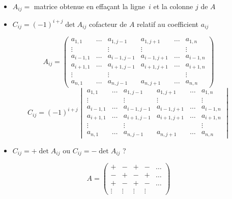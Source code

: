 \begin{frame}
\begin{itemize}
  \item $A_{ij} =$ matrice obtenue en effaçant la ligne~$i$ et la colonne $j$ de $A$
  \item<4-> $C_{ij} = (-1)^{i+j}\det A_{ij} $ cofacteur de $A$ relatif au coefficient $a_{ij}$
\end{itemize}

 \begin{overprint}
  
\vspace{.2cm}
\[
A_{ij} = \begin{pmatrix}
a_{1,1} & \dots & a_{1,j-1} & a_{1,j+1} &\dots & a_{1,n}\\
\vdots &&\vdots &\vdots &&\vdots \\
a_{i-1,1} & \dots & a_{i-1,j-1} & a_{i-1,j+1} &\dots & a_{i-1,n}\\
a_{i+1,1} & \dots & a_{i+1,j-1} & a_{i+1,j+1} &\dots & a_{i+1,n}\\
\vdots &&\vdots &&&\vdots \\
a_{n,1} & \dots & a_{n,j-1} & a_{n,j+1}& \dots & a_{n,n}  
\end{pmatrix}
\]
\vspace{.2cm}
\[
C_{ij} = (-1)^{i+j}\begin{vmatrix}
a_{1,1} & \dots & a_{1,j-1} & a_{1,j+1} &\dots & a_{1,n}\\
\vdots &&\vdots &\vdots &&\vdots \\
a_{i-1,1} & \dots & a_{i-1,j-1} & a_{i-1,j+1} &\dots & a_{i-1,n}\\
a_{i+1,1} & \dots & a_{i+1,j-1} & a_{i+1,j+1} &\dots & a_{i+1,n}\\
\vdots &&\vdots &&&\vdots \\
a_{n,1} & \dots & a_{n,j-1} & a_{n,j+1}& \dots & a_{n,n}  
\end{vmatrix}
\]
 \end{overprint}
 
 \vspace{-2.5cm}
\begin{itemize}
  \item<6-> $C_{ij} = +\det A_{ij} $ ou $C_{ij} = -\det A_{ij}$ ?
\end{itemize} 
$$  A = 
\begin{pmatrix}
+ & - & + & - &\dots\\
- & + & - & + &\dots \\
+ & - & + & - &\dots\\
\vdots & \vdots & \vdots & \vdots &          
\end{pmatrix}
$$


\end{frame}

